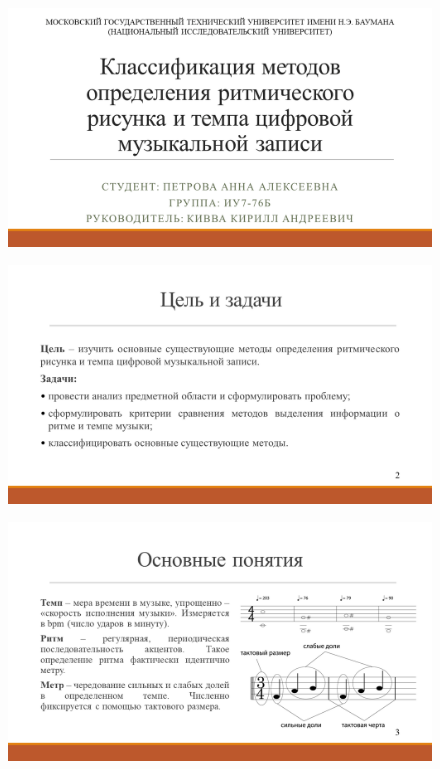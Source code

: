 \label{app:presentation}

\begin{figure}[h!]
	\begin{center}
		\includegraphics[angle=90,scale=0.65]{slides/Slide1.png}
	\end{center}
\end{figure}

\begin{figure}[h!]
	\begin{center}
		\includegraphics[angle=90,scale=0.75]{slides/Slide2.png}
	\end{center}
\end{figure}

\begin{figure}[h!]
	\begin{center}
		\includegraphics[angle=90,scale=0.75]{slides/Slide3.png}
	\end{center}
\end{figure}

